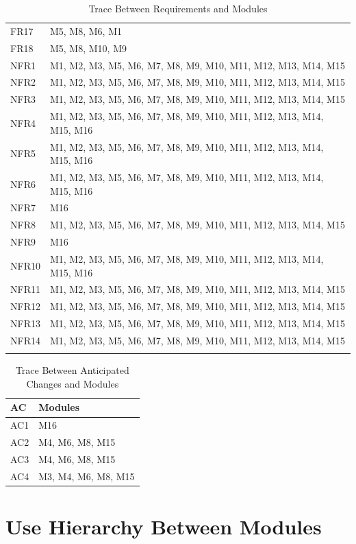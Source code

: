 \documentclass[12pt, titlepage]{article}
\begin{document}
\begin{longtable}[h]{p{} p{}}
FR17 & M5, M8, M6, M1\\
FR18 & M5, M8, M10, M9\\
NFR1 & M1, M2, M3, M5, M6, M7, M8, M9, M10, M11, M12, M13, M14, M15\\
NFR2 & M1, M2, M3, M5, M6, M7, M8, M9, M10, M11, M12, M13, M14, M15\\
NFR3 & M1, M2, M3, M5, M6, M7, M8, M9, M10, M11, M12, M13, M14, M15\\
NFR4 & M1, M2, M3, M5, M6, M7, M8, M9, M10, M11, M12, M13, M14, M15, M16\\
NFR5 & M1, M2, M3, M5, M6, M7, M8, M9, M10, M11, M12, M13, M14, M15, M16\\
NFR6 & M1, M2, M3, M5, M6, M7, M8, M9, M10, M11, M12, M13, M14, M15, M16\\
NFR7 & M16\\
NFR8 & M1, M2, M3, M5, M6, M7, M8, M9, M10, M11, M12, M13, M14, M15\\
NFR9 & M16\\
NFR10 & M1, M2, M3, M5, M6, M7, M8, M9, M10, M11, M12, M13, M14, M15, M16\\
NFR11 & M1, M2, M3, M5, M6, M7, M8, M9, M10, M11, M12, M13, M14, M15\\
NFR12 & M1, M2, M3, M5, M6, M7, M8, M9, M10, M11, M12, M13, M14, M15\\
NFR13 & M1, M2, M3, M5, M6, M7, M8, M9, M10, M11, M12, M13, M14, M15\\
NFR14 & M1, M2, M3, M5, M6, M7, M8, M9, M10, M11, M12, M13, M14, M15\\
\bottomrule
\caption{Trace Between Requirements and Modules}
\label{TblRT}
\end{longtable}

\begin{table}[H]
\centering
\begin{tabular}{p{} p{}}
\toprule
\textbf{AC} & \textbf{Modules}\\
\midrule
AC1 & M16\\
AC2 & M4, M6, M8, M15\\
AC3 & M4, M6, M8, M15\\
AC4 & M3, M4, M6, M8, M15\\
\bottomrule
\end{tabular}
\caption{Trace Between Anticipated Changes and Modules}
\label{TblACT}
\end{table}

\section{Use Hierarchy Between Modules} \label{SecUse}
\end{document}
